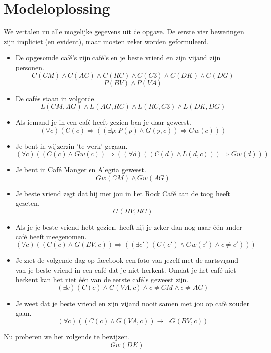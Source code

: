 \documentclass[alternative-exam.tex]{subfiles}
\begin{document}
\section{Modeloplossing}
We vertalen nu alle mogelijke gegevens uit de opgave. De eerste vier beweringen zijn impliciet (en evident), maar moeten zeker worden geformuleerd.
\begin{itemize}
\item De opgesomde caf\'e's zijn caf\'e's en je beste vriend en zijn vijand zijn personen.
\[ C(CM)\wedge C(AG)\wedge C(RC)\wedge C(C3)\wedge C(DK)\wedge C(DG) \]
\[ P(BV) \wedge P(VA)\]
\item De caf\'es staan in volgorde.
\[
L(CM,AG) \wedge L(AG,RC) \wedge L(RC,C3) \wedge L(DK,DG) 
\]
\item Als iemand je in een caf\'e heeft gezien ben je daar geweest.
\[
(\forall c)(C(c) \Rightarrow ((\exists p : P(p) \wedge G(p,c)) \Rightarrow Gw(c)))
\]
\item Je bent in wijzerzin 'te werk' gegaan.
\[
(\forall c)(( C(c) \wedge Gw(c)) \Rightarrow ((\forall d)(( C(d) \wedge L(d,c)))\Rightarrow Gw(d)))
\]
\item Je bent in Caf\'e Manger en Alegria geweest.
\[
Gw(CM) \wedge Gw(AG)
\]
\item Je beste vriend zegt dat hij met jou in het Rock Caf\'e aan de toog heeft gezeten.
\[
G(BV,RC)
\]
\item Als je je beste vriend hebt gezien, heeft hij je zeker dan nog naar \'e\'en ander caf\'e heeft meegenomen.
\[
(\forall c) ((C(c) \wedge G(BV,c)) \Rightarrow ((\exists c') (C(c') \wedge Gw(c') \wedge c \neq c')))
\]
\item Je ziet de volgende dag op facebook een foto van jezelf met de aartsvijand van je beste vriend in een caf\'e dat je niet herkent. Omdat je het caf\'e niet herkent kan het niet \'e\'en van de eerste caf\'e's geweest zijn. 
\[
(\exists c) (C(c) \wedge G(VA,c) \wedge c\neq CM \wedge c \neq AG)
\]
\item Je weet dat je beste vriend en zijn vijand nooit samen met jou op caf\'e zouden gaan.
\[
(\forall c) ((C(c) \wedge G(VA,c)) \rightarrow \neg G(BV,c))
\]
\end{itemize}
Nu proberen we het volgende te bewijzen.
\[
Gw(DK)
\]
\end{document}
